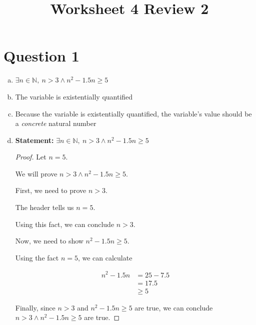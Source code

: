 \documentclass[12pt]{article}
\begin{document}
\title{Worksheet 4 Review 2}
\maketitle

\section*{Question 1}
\begin{enumerate}[a.]
    \item $\exists n \in \mathbb{N},\:n > 3 \land n^2 -1.5n \geq 5$
    \item The variable is existentially quantified
    \item Because the variable is existentially quantified, the variable's value
    should be a \textit{concrete} natural number
    \item

    \textbf{Statement:} $\exists n \in \mathbb{N},\:n > 3 \land n^2 -1.5n \geq 5$

    \bigskip

    \begin{proof}
    Let $n = 5$.

    \bigskip

    We will prove $n > 3 \land n^2 -1.5n \geq 5$.

    \bigskip

    First, we need to prove $n > 3$.

    \bigskip

    The header tells us $n=5$.

    \bigskip

    Using this fact, we can conclude $n > 3$.

    \bigskip

    Now, we need to show $n^2 - 1.5n \geq 5$.

    \bigskip

    Using the fact $n = 5$, we can calculate

    \begin{align}
        n^2 - 1.5n &= 25 - 7.5\\
        &= 17.5\\
        &\geq 5
    \end{align}

    \bigskip

    Finally, since $n > 3$ and $n^2 - 1.5n \geq 5$ are true, we can conclude
    $n > 3 \land n^2 - 1.5n \geq 5$ are true.
    \end{proof}


\end{enumerate}
\end{document}

